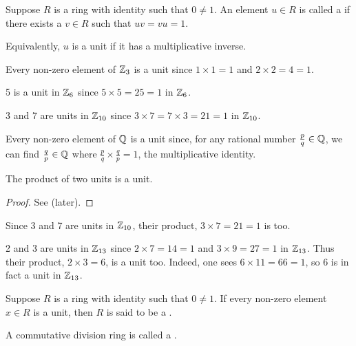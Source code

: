 \begin{definition}
    Suppose $R$ is a ring with identity such that $0 \neq 1$. An element $u \in R$ is called a  if there exists a $v \in R$ such that $uv=vu=1$.

    Equivalently, $u$ is a unit if it has a multiplicative inverse.
\end{definition}
\begin{example}
    Every non-zero element of $\mathbb{Z}_3$ is a unit since $1 \times 1 = 1$ and $2 \times 2 = 4 = 1$.
\end{example}
\begin{example}
    5 is a unit in $\mathbb{Z}_6$ since $5 \times 5 = 25 = 1$ in $\mathbb{Z}_6$.
\end{example}
\begin{example}
    3 and 7 are units in $\mathbb{Z}_{10}$ since $3 \times 7 = 7 \times 3 = 21 = 1$ in $\mathbb{Z}_{10}$.
\end{example}
\begin{example}
    Every non-zero element of $\mathbb{Q}$ is a unit since, for any rational number $\frac pq \in \mathbb{Q}$, we can find $\frac qp \in \mathbb{Q}$ where $\frac pq \times \frac qp = 1$, the multiplicative identity.
\end{example}

\begin{proposition}\label{prop-product-of-units-is-unit}
    The product of two units is a unit.
\end{proposition}
\begin{proof}
    See  (later).
\end{proof}
\begin{example}
    Since 3 and 7 are units in $\mathbb{Z}_{10}$, their product, $3 \times 7 = 21 = 1$ is too.
\end{example}
\begin{example}
    2 and 3 are units in $\mathbb{Z}_{13}$ since $2 \times 7 = 14 = 1$ and $3 \times 9 = 27 = 1$ in $\mathbb{Z}_{13}$. Thus their product, $2 \times 3 = 6$, is a unit too. Indeed, one sees $6 \times 11 = 66 = 1$, so 6 is in fact a unit in $\mathbb{Z}_{13}$.
\end{example}

\begin{definition}
    Suppose $R$ is a ring with identity such that $0 \neq 1$. If every non-zero element $x \in R$ is a unit, then $R$ is said to be a .
\end{definition}

\begin{definition}
    A commutative division ring is called a .
\end{definition}

